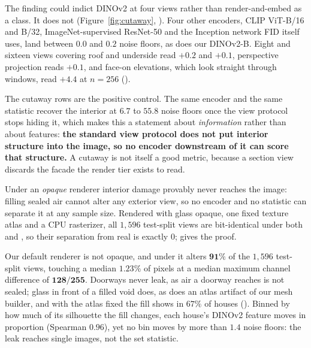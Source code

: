 The finding could indict DINOv2 at four views rather than render-and-embed as a class. It
does not (Figure~\ref{fig:cutaway}, ). Four other encoders, CLIP
ViT-B/16 and B/32, ImageNet-supervised ResNet-50 and the Inception network FID itself uses,
land between $0.0$ and $0.2$ noise floors, as does our DINOv2-B. Eight and sixteen views
covering roof and underside read $+0.2$ and $+0.1$, perspective projection reads $+0.1$, and
face-on elevations, which look straight through windows, read $+4.4$ at $n{=}256$ ().

The cutaway rows are the positive control. The same encoder and the same statistic recover
the interior at $6.7$ to $55.8$ noise floors once the view protocol stops hiding it, which
makes this a statement about \emph{information} rather than about features:
\textbf{the standard view protocol does not put interior structure into the image, so no
encoder downstream of it can score that structure.} A cutaway is not itself a good metric,
because a section view discards the facade the render tier exists to read.

Under an \emph{opaque} renderer interior damage provably never reaches the image: filling sealed air cannot alter any exterior
view, so no encoder and no statistic can separate it at any sample size. Rendered with
glass opaque, one fixed texture atlas and a CPU rasterizer, all $1{,}596$ test-split views are
bit-identical under both \solidify{} and \hollow{}, so their \mvkid{} separation from real is
exactly $0$;  gives the proof.

Our default renderer is not opaque, and under it \solidify{} alters $\mathbf{91\%}$ of the
$1{,}596$ test-split views, touching a median $1.23\%$ of pixels at a median maximum
channel difference of $\mathbf{128/255}$. Doorways never leak, as air a doorway reaches is
not sealed; glass in front of a filled void does, as does an atlas artifact of our mesh
builder, and with the atlas fixed the fill shows in $67\%$ of houses ().
Binned by how much of its silhouette the fill changes, each house's DINOv2 feature moves
in proportion (Spearman $0.96$), yet no bin moves \mvkid{} by more than $1.4$ noise floors:
the leak reaches single images, not the set statistic.

